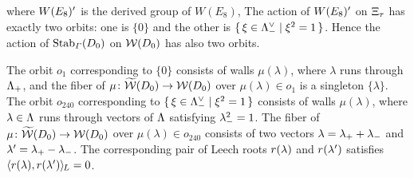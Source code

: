 \documentclass{amsart} %
\begin{document}
where $W(E_8)^{\prime}$ is the derived group of $W(E_8)$,
The action of $W(E_8)^{\prime}$ on $\Xi_{\tau}$ has exactly two orbits:
one is 
$\{0\}$ and the other is $\{\,{\xi\in \Lambda_{-}^{\vee}}\mid {\xi^2=1} \,\}$.
Hence the action of $\operatorname{Stab}_{\varGamma}(D_0)$ on $\mathord{\mathcal{W}}(D_0)$ 
has also two orbits.
\par
The orbit $o_1$ corresponding to $\{0\}$
consists of walls $\mu(\lambda)$,
where $\lambda$ runs through $\Lambda_{+}$,
and the fiber of $\mu\colon \widetilde{\mathord{\mathcal{W}}}(D_0)\to\mathord{\mathcal{W}}(D_0)$ 
over $\mu(\lambda)\in o_1$ is a singleton $\{\lambda\}$.
The orbit $o_{240}$ corresponding to $\{\,{\xi\in \Lambda_{-}^{\vee}}\mid {\xi^2=1} \,\}$
consists of walls $\mu(\lambda)$,
where $\lambda\in \Lambda$ runs through
vectors of $\Lambda$ satisfying ${\lambda}_{-}^2=1$.
The fiber of $\mu\colon \widetilde{\mathord{\mathcal{W}}}(D_0)\to\mathord{\mathcal{W}}(D_0)$ 
over $\mu(\lambda)\in o_{240}$ consists 
of two vectors
$\lambda={\lambda}_{+}+{\lambda}_{-}$ and $\lambda^{\prime}={\lambda}_{+}-{\lambda}_{-}$.
The corresponding pair of Leech roots 
$r(\lambda)$ and $r(\lambda^{\prime})$ satisfies
$\langle r(\lambda), r(\lambda^{\prime}) \rangle_{\hskip -1pt L}=0$.
%
%
\end{document}
